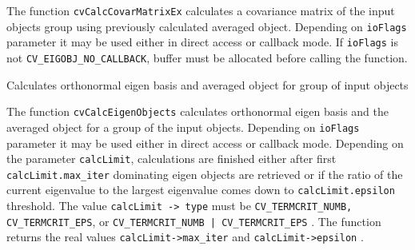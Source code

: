 The function \texttt{cvCalcCovarMatrixEx} calculates a covariance matrix of the input objects group using previously calculated averaged object. Depending on \texttt{ioFlags} parameter it may be used either in direct access or callback mode. If \texttt{ioFlags} is not \texttt{CV\_EIGOBJ\_NO\_CALLBACK}, buffer must be allocated before calling the function.


Calculates orthonormal eigen basis and averaged object for group of input objects


\begin{description}
\end{description}

The function \texttt{cvCalcEigenObjects} calculates orthonormal eigen basis and the averaged object for a group of the input objects. Depending on \texttt{ioFlags} parameter it may be used either in direct access or callback mode. Depending on the parameter \texttt{calcLimit}, calculations are finished either after first \texttt{calcLimit.max\_iter} dominating eigen objects are retrieved or if the ratio of the current eigenvalue to the largest eigenvalue comes down to \texttt{calcLimit.epsilon} threshold. The value \texttt{calcLimit -> type} must be \texttt{CV\_TERMCRIT\_NUMB, CV\_TERMCRIT\_EPS}, or \texttt{CV\_TERMCRIT\_NUMB | CV\_TERMCRIT\_EPS} . The function returns the real values \texttt{calcLimit->max\_iter} and \texttt{calcLimit->epsilon} .

